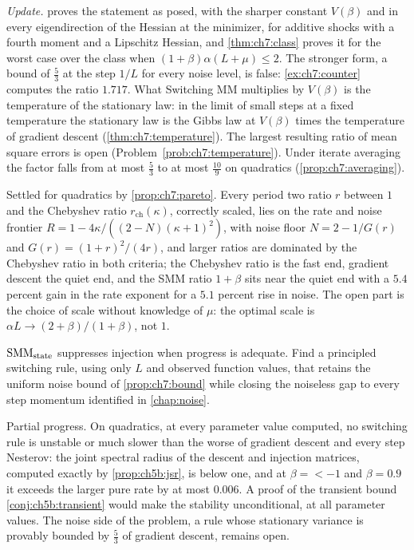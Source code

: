 \emph{Update.}  proves the statement as posed, with the sharper constant $V(\beta)$ and in every eigendirection of the Hessian at the minimizer, for additive shocks with a fourth moment and a Lipschitz Hessian, and \cref{thm:ch7:class} proves it for the worst case over the class when $(1+\beta)\alpha(L+\mu)\le2$. The stronger form, a bound of $\tfrac53$ at the step $1/L$ for every noise level, is false: \cref{ex:ch7:counter} computes the ratio $1.717$. What Switching MM multiplies by $V(\beta)$ is the temperature of the stationary law: in the limit of small steps at a fixed temperature the stationary law is the Gibbs law at $V(\beta)$ times the temperature of gradient descent (\cref{thm:ch7:temperature}). The largest resulting ratio of mean square errors is open (Problem~\ref{prob:ch7:temperature}). Under iterate averaging the factor falls from at most $\tfrac53$ to at most $\tfrac{10}9$ on quadratics (\cref{prop:ch7:averaging}).

\begin{problem*}\label{prob:ch11:s3}
Settled for quadratics by \cref{prop:ch7:pareto}. Every period two ratio $r$ between $1$ and the Chebyshev ratio $r_{\mathrm{ch}}(\kappa)$,
correctly scaled, lies on the rate and noise frontier
$R=1-4\kappa/((2-N)(\kappa+1)^2)$, with noise floor $N=2-1/G(r)$ and
$G(r)=(1+r)^2/(4r)$, and larger ratios are dominated by the Chebyshev ratio in both criteria; the Chebyshev ratio is the fast end, gradient descent the
quiet end, and the SMM ratio $1+\beta$ sits near the quiet end with a $5.4$
percent gain in the rate exponent for a $5.1$ percent rise in noise. The open part is the
choice of scale without knowledge of $\mu$: the optimal scale is
$\alpha L\to(2+\beta)/(1+\beta)$, not $1$.
\end{problem*}

\begin{problem*}\label{prob:ch11:s4}
$\mathrm{SMM}_{\mathrm{state}}$ suppresses injection when progress is adequate. Find a principled
switching rule, using only $L$ and observed function values, that retains the
uniform noise bound of \cref{prop:ch7:bound} while closing the noiseless gap
to every step momentum identified in \cref{chap:noise}.
\end{problem*}

Partial progress. On quadratics, at every parameter value computed, no switching rule is unstable or much slower than the worse of gradient descent and every step Nesterov: the joint spectral radius of the descent and injection matrices, computed exactly by \cref{prop:ch5b:jsr}, is below one, and at $\beta=\lt-1$ and $\beta=0.9$ it exceeds the larger pure rate by at most $0.006$.
A proof of the transient bound \cref{conj:ch5b:transient} would make the stability unconditional, at all parameter values. The noise side of the problem, a rule whose stationary variance is
provably bounded by $\frac53$ of gradient descent, remains open.


